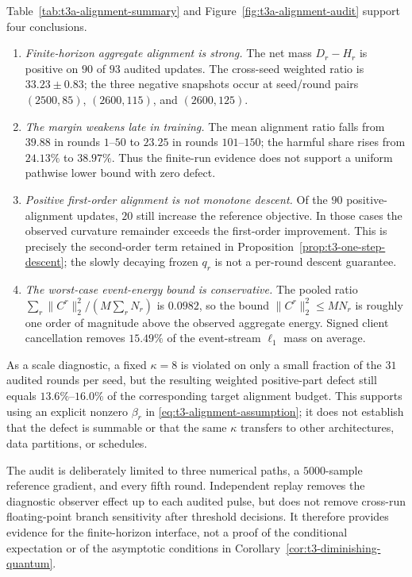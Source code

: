 Table~\ref{tab:t3a-alignment-summary} and
Figure~\ref{fig:t3a-alignment-audit} support four conclusions.
\begin{enumerate}
    \item \emph{Finite-horizon aggregate alignment is strong.}  The net mass
    $D_r-H_r$ is positive on $90$ of $93$ audited updates.  The cross-seed
    weighted ratio is $33.23\pm0.83$; the three negative snapshots occur at
    seed/round pairs $(2500,85)$, $(2600,115)$, and $(2600,125)$.
    \item \emph{The margin weakens late in training.}  The mean alignment ratio
    falls from $39.88$ in rounds $1$--$50$ to $23.25$ in rounds $101$--$150$;
    the harmful share rises from $24.13\%$ to $38.97\%$.  Thus the finite-run
    evidence does not support a uniform pathwise lower bound with zero defect.
    \item \emph{Positive first-order alignment is not monotone descent.}  Of
    the $90$ positive-alignment updates, $20$ still increase the reference
    objective.  In those cases the observed curvature remainder exceeds the
    first-order improvement.  This is precisely the second-order term retained
    in Proposition~\ref{prop:t3-one-step-descent}; the slowly decaying frozen
    $q_r$ is not a per-round descent guarantee.
    \item \emph{The worst-case event-energy bound is conservative.}  The pooled
    ratio $\sum_r\|C^r\|_2^2/(M\sum_rN_r)$ is $0.0982$, so the bound
    $\|C^r\|_2^2\leq MN_r$ is roughly one order of magnitude above the observed
    aggregate energy.  Signed client cancellation removes $15.49\%$ of the
    event-stream $\ell_1$ mass on average.
\end{enumerate}

As a scale diagnostic, a fixed $\kappa=8$ is violated on only a small fraction
of the $31$ audited rounds per seed, but the resulting weighted positive-part
defect still equals $13.6\%$--$16.0\%$ of the corresponding target alignment
budget.
This supports using an explicit nonzero $\beta_r$ in
\eqref{eq:t3-alignment-assumption}; it does not establish that the defect is
summable or that the same $\kappa$ transfers to other architectures, data
partitions, or schedules.

The audit is deliberately limited to three numerical paths, a
$5000$-sample reference gradient, and every fifth round.  Independent replay
removes the diagnostic observer effect up to each audited pulse, but does not
remove cross-run floating-point branch sensitivity after threshold decisions.
It therefore provides evidence for the
finite-horizon interface, not a proof of the conditional expectation or of the
asymptotic conditions in Corollary~\ref{cor:t3-diminishing-quantum}.


